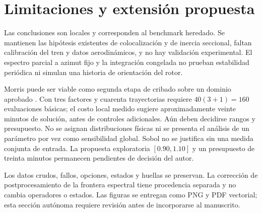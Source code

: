 \section{Limitaciones y extensión propuesta}
Las conclusiones son locales y corresponden al benchmark heredado. Se mantienen las hipótesis existentes de colocalización y de inercia seccional, faltan calibración del tren y datos aerodinámicos, y no hay validación experimental. El espectro parcial a azimut fijo y la integración congelada no prueban estabilidad periódica ni simulan una historia de orientación del rotor.

Morris puede ser viable como segunda etapa de cribado sobre un dominio aprobado \cite{morris1991}. Con tres factores y cuarenta trayectorias requiere $40(3+1)=160$ evaluaciones básicas; el costo local medido sugiere aproximadamente veinte minutos de solución, antes de controles adicionales. Aún deben decidirse rangos y presupuesto. No se asignan distribuciones físicas ni se presenta el análisis de un parámetro por vez como sensibilidad global. Sobol no se justifica sin una medida conjunta de entrada. La propuesta exploratoria $[0.90,1.10]$ y un presupuesto de treinta minutos permanecen pendientes de decisión del autor.

Los datos crudos, fallos, opciones, estados y huellas se preservan. La corrección de postprocesamiento de la frontera espectral tiene procedencia separada y no cambia operadores o estados. Las figuras se entregan como PNG y PDF vectorial; esta sección autónoma requiere revisión antes de incorporarse al manuscrito.

